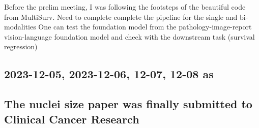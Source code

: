 \documentclass{article}%
\begin{document}
\newline%
\newline%
%
Before the prelim meeting, I was following the footsteps of the beautiful code from MultiSurv. Need to complete complete the pipeline for the single and bi{-}modalities %
\newline%
\newline%
%
%
\newline%
\newline%
%
One can test the foundation model from the pathology{-}image{-}report vision{-}language foundation model and check with the downstream task (survival regression) %
\newline%
\newline%
%
%
\newline%
\newline%
%
%
\newline%
\newline%
%
\subsection{2023{-}12{-}05, 2023{-}12{-}06, 12{-}07, 12{-}08 as}%
\label{subsec:2023{-}12{-}05,2023{-}12{-}06,12{-}07,12{-}08as}%

%
\subsection{The nuclei size paper was finally submitted to Clinical Cancer Research }%
\label{subsec:ThenucleisizepaperwasfinallysubmittedtoClinicalCancerResearch}%
\end{document}
